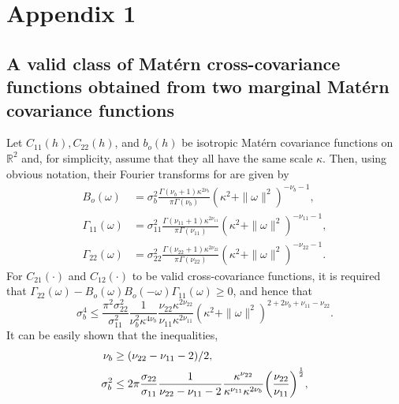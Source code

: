 \documentclass[lineno]{biometrika}
\newcommand{\omegab} {\omega}
\newcommand{\h}{h}
\let\originalleft\left
\let\originalright\right
\renewcommand{\left}{\mathopen{}\mathclose\bgroup\originalleft}
\renewcommand{\right}{\aftergroup\egroup\originalright}
\begin{document}



\newpage

\appendix

\appendixone
\section*{Appendix 1}
\subsection*{A valid class of Mat{\'e}rn cross-covariance functions obtained from two marginal Mat{\'e}rn covariance functions}

Let $C_{11}(\h), C_{22}(\h)$, and $b_o(\h)$ be isotropic Mat{\'e}rn covariance functions on $\mathbb{R}^2$ and, for simplicity, assume that they all have the same scale $\kappa$. Then, using obvious notation, their Fourier transforms for are given by
\begin{align*}
B_o(\omegab) &= \sigma^2_b\frac{\Gamma(\nu_b + 1) \kappa^{2\nu_b}}{\pi\Gamma(\nu_b)}(\kappa^2 + \|\omegab\|^2)^{-\nu_b - 1}, \\
\Gamma_{11}(\omegab) &= \sigma^2_{11}\frac{\Gamma(\nu_{11} + 1) \kappa^{2\nu_{11}}}{\pi\Gamma(\nu_{11})}(\kappa^2 + \|\omegab\|^2)^{-\nu_{11} - 1}, \\
\Gamma_{22}(\omegab) &= \sigma^2_{22}\frac{\Gamma(\nu_{22} + 1) \kappa^{2\nu_{22}}}{\pi\Gamma(\nu_{22})}(\kappa^2 + \|\omegab\|^2)^{-\nu_{22} - 1}.
\end{align*}
\noindent For $C_{21}(\cdot)$ and $C_{12}(\cdot)$ to be valid cross-covariance functions, it is required that $\Gamma_{22}(\omegab) - B_o(\omegab)B_o(-\omegab)\Gamma_{11}(\omegab) \ge 0$, and hence that
\begin{equation}\label{eq:sigmab_ineq}
\sigma_b^4 \le \frac{\pi^2\sigma^2 _{22}}{\sigma^2_{11}}\frac{1}{\nu_b^2\kappa^{4\nu_b}}\frac{\nu_{22}\kappa^{2\nu_{22}}}{\nu_{11}\kappa^{2\nu_{11}}}(\kappa^2 + \|\omegab\|^2)^{2 + 2\nu_b + \nu_{11} - \nu_{22}}.
\end{equation}
\noindent It can be easily shown that the inequalities,
\begin{align}
\nu_b &\ge (\nu_{22} - \nu_{11} -2)/2, \label{eq:cond2} \\
\sigma_b^2 &\le 2\pi\frac{\sigma_{22}}{\sigma_{11}}\frac{1}{\nu_{22} - \nu_{11} - 2}\frac{\kappa^{\nu_{22}}}{\kappa^{\nu_{11}}\kappa^{2\nu_{b}}}\left(\frac{\nu_{22}}{\nu_{11}}\right)^{\frac{1}{2}}, \label{eq:sigma2b}
\end{align}
\end{document}
